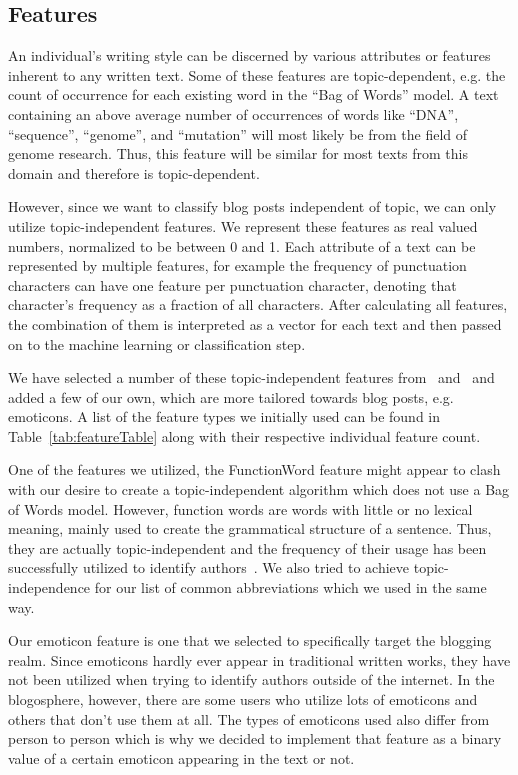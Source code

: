 \subsection{Features}
\label{sec:features}

An individual's writing style can be discerned by various attributes or features inherent to any written text.
Some of these features are topic-dependent, e.g. the count of occurrence for each existing word in the ``Bag of Words'' model.
A text containing an above average number of occurrences of words like ``DNA'', ``sequence'', ``genome'', and ``mutation'' will most likely be from the field of genome research.
Thus, this feature will be similar for most texts from this domain and therefore is topic-dependent.


However, since we want to classify blog posts independent of topic, we can only utilize topic-independent features.
We represent these features as real valued numbers, normalized to be between 0 and 1.
Each attribute of a text can be represented by multiple features, for example the frequency of punctuation characters can have one feature per punctuation character, denoting that character's frequency as a fraction of all characters.
After calculating all features, the combination of them is interpreted as a vector for each text and then passed on to the machine learning or classification step.


We have selected a number of these topic-independent features from~\cite{madigan2005author} and~\cite{narayanan2012feasibility} and added a few of our own, which are more tailored towards blog posts, e.g. emoticons.
A list of the feature types we initially used can be found in Table~\ref{tab:featureTable} along with their respective individual feature count.


One of the features we utilized, the FunctionWord feature might appear to clash with our desire to create a topic-independent algorithm which does not use a Bag of Words model.
However, function words are words with little or no lexical meaning, mainly used to create the grammatical structure of a sentence.
Thus, they are actually topic-independent and the frequency of their usage has been successfully utilized to identify authors~\cite{mosteller1962applied}.
We also tried to achieve topic-independence for our list of common abbreviations which we used in the same way.


Our emoticon feature is one that we selected to specifically target the blogging realm.
Since emoticons hardly ever appear in traditional written works, they have not been utilized when trying to identify authors outside of the internet.
In the blogosphere, however, there are some users who utilize lots of emoticons and others that don't use them at all.
The types of emoticons used also differ from person to person which is why we decided to implement that feature as a binary value of a certain emoticon appearing in the text or not.


